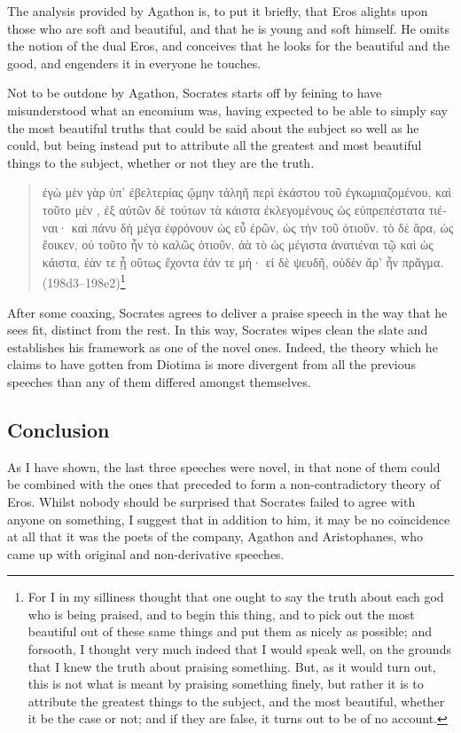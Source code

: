 The analysis provided by Agathon is, to put it briefly, that Eros
alights upon those who are soft and beautiful, and that he is young and
soft himself. He omits the notion of the dual Eros, and conceives that
he looks for the beautiful and the good, and engenders it in everyone he
touches.

Not to be outdone by Agathon, Socrates starts off by feining to have
misunderstood what an encomium was, having expected to be able to simply
say the most beautiful truths that could be said about the subject so
well as he could, but being instead put to attribute all the greatest
and most beautiful things to the subject, whether or not they are the
truth.

\begin{quote}
\textgreek{ἐγὼ μὲν γὰρ ὑπ' ἐβελτερίας ᾤμην  τἀληῆ
 περὶ ἑκάστου τοῦ ἐγκωμιαζομένου, καὶ τοῦτο μὲν
, ἐξ αὐτῶν δὲ τούτων τὰ κάιστα ἐκλεγομένους ὡς
εὐπρεπέστατα τιέναι· καὶ πάνυ δὴ μέγα ἐφρόνουν ὡς εὖ ἐρῶν, ὡς
 τὴν  τοῦ  ὁτιοῦν. τὸ
δὲ ἄρα, ὡς ἔοικεν, οὐ τοῦτο ἦν τὸ καλῶς  ὁτιοῦν,
ἀὰ τὸ ὡς μέγιστα ἀνατιέναι τῷ  καὶ ὡς
κάιστα, ἐὰν τε ᾖ οὕτως ἔχοντα ἐάν τε μή· εἰ δὲ ψευδῆ, οὐδὲν
ἄρ' ἦν πρᾶγμα.} (198d3--198e2)\footnote{For I in my silliness thought
that one ought to say the truth about each god who is being praised,
and to begin this thing, and to pick out the most beautiful out of
these same things and put them as nicely as possible; and forsooth, I
thought very much indeed that I would speak well, on the grounds that
I knew the truth about praising something. But, as it would turn out,
this is not what is meant by praising something finely, but rather it
is to attribute the greatest things to the subject, and the most
beautiful, whether it be the case or not; and if they are false, it
turns out to be of no account.}
\end{quote}

After some coaxing, Socrates agrees to deliver a praise speech in the
way that he sees fit, distinct from the rest. In this way, Socrates
wipes clean the slate and establishes his framework as one of the novel
ones. Indeed, the theory which he claims to have gotten from Diotima is
more divergent from all the previous speeches than any of them differed
amongst themselves.

\subsection*{Conclusion}

As I have shown, the last three speeches were novel, in that none of
them could be combined with the ones that preceded to form a
non-contradictory theory of Eros. Whilst nobody should be surprised that
Socrates failed to agree with anyone on something, I suggest that in
addition to him, it may be no coincidence at all that it was the poets
of the company, Agathon and Aristophanes, who came up with original and
non-derivative speeches.
